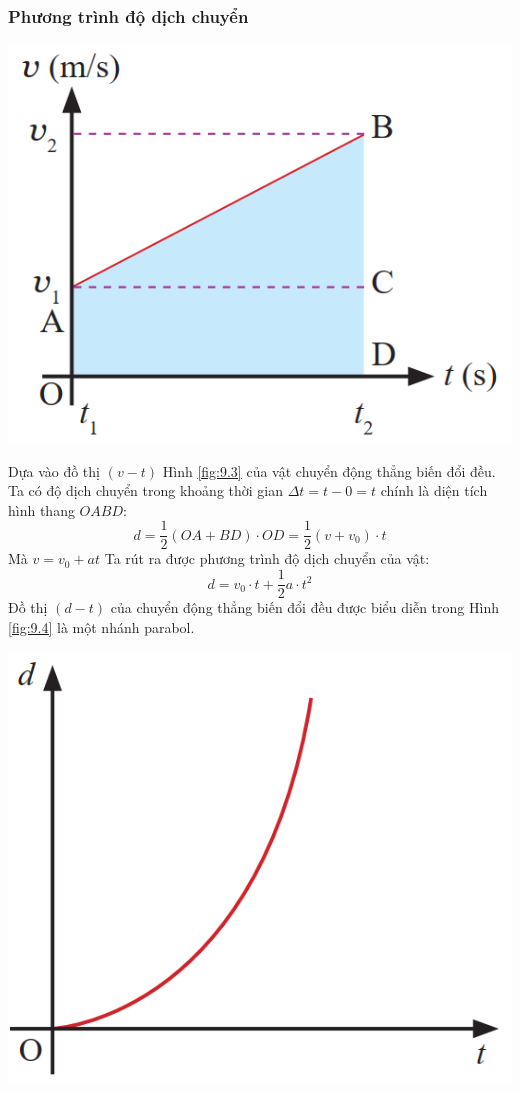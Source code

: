 \begin{tomtat}
\subsubsection{Phương trình độ dịch chuyển}
\begin{center}
	\includegraphics[scale=0.4]{figs/G10Y25B6-10}
	\label{fig:9.3}
\end{center}
Dựa vào đồ thị $\left(v - t\right)$ Hình \ref{fig:9.3} của vật chuyển động thẳng biến đổi đều. Ta có độ dịch chuyển trong khoảng thời gian $\Delta t= t- 0 =t$ chính là diện tích hình thang $OABD$:
$$d=\dfrac{1}{2}\left(OA+BD\right)\cdot OD=\dfrac{1}{2}\left(v+v_0\right)\cdot t$$
Mà $v=v_0+at$
Ta rút ra được phương trình độ dịch chuyển của vật:
$$d=v_0\cdot t+\dfrac{1}{2}a\cdot t^2$$
Đồ thị $\left(d - t\right)$ của chuyển động thẳng biến đổi đều được biểu diễn trong Hình \ref{fig:9.4} là một nhánh parabol.
\begin{center}
	\includegraphics[scale=0.5]{figs/G10Y25B6-11}

\end{center}
\end{tomtat}
